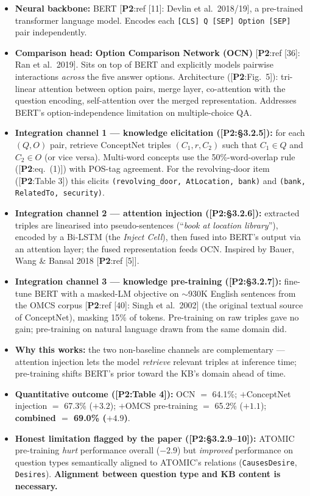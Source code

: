 \documentclass[11pt, a4paper]{article}
\newcommand{\paperref}[1]{\textcolor{srcBd}{\small[\textbf{P2}:#1]}}
\begin{document}
\begin{itemize}
  \item \textbf{Neural backbone:} BERT \paperref{ref [11]: Devlin et al.\ 2018/19}, a pre-trained transformer language model. Encodes each \texttt{[CLS] Q [SEP] Option [SEP]} pair independently.
  \item \textbf{Comparison head:} \textbf{Option Comparison Network (OCN)} \paperref{ref [36]: Ran et al.\ 2019}. Sits on top of BERT and explicitly models pairwise interactions \emph{across} the five answer options. Architecture (\paperref{Fig.\ 5}): tri-linear attention between option pairs, merge layer, co-attention with the question encoding, self-attention over the merged representation. Addresses BERT's option-independence limitation on multiple-choice QA.
  \item \textbf{Integration channel 1 — knowledge elicitation (\paperref{§3.2.5}):} for each \((Q, O)\) pair, retrieve ConceptNet triples \((C_1, r, C_2)\) such that \(C_1 \in Q\) and \(C_2 \in O\) (or vice versa). Multi-word concepts use the 50\%-word-overlap rule (\paperref{eq.\ (1)}) with POS-tag agreement. For the revolving-door item (\paperref{Table 3}) this elicits \texttt{(revolving\_door, AtLocation, bank)} and \texttt{(bank, RelatedTo, security)}.
  \item \textbf{Integration channel 2 — attention injection (\paperref{§3.2.6}):} extracted triples are linearised into pseudo-sentences (``\emph{book at location library}''), encoded by a Bi-LSTM (the \emph{Inject Cell}), then fused into BERT's output via an attention layer; the fused representation feeds OCN. Inspired by Bauer, Wang \& Bansal 2018 \paperref{ref [5]}.
  \item \textbf{Integration channel 3 — knowledge pre-training (\paperref{§3.2.7}):} fine-tune BERT with a masked-LM objective on \(\sim\)930K English sentences from the OMCS corpus \paperref{ref [40]: Singh et al.\ 2002} (the original textual source of ConceptNet), masking 15\% of tokens. Pre-training on raw triples gave no gain; pre-training on natural language drawn from the same domain did.
  \item \textbf{Why this works:} the two non-baseline channels are complementary — attention injection lets the model \emph{retrieve} relevant triples at inference time; pre-training shifts BERT's prior toward the KB's domain ahead of time.
  \item \textbf{Quantitative outcome (\paperref{Table 4}):} OCN $=$ 64.1\%; $+$ConceptNet injection $=$ 67.3\% ($+3.2$); $+$OMCS pre-training $=$ 65.2\% ($+1.1$); \textbf{combined $=$ 69.0\% ($+4.9$)}.
  \item \textbf{Honest limitation flagged by the paper (\paperref{§3.2.9--10}):} ATOMIC pre-training \emph{hurt} performance overall ($-2.9$) but \emph{improved} performance on question types semantically aligned to ATOMIC's relations (\texttt{CausesDesire}, \texttt{Desires}). \textbf{Alignment between question type and KB content is necessary.}
\end{itemize}
\end{document}
